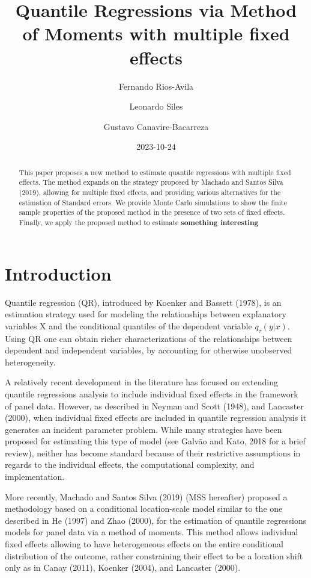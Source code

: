 \documentclass[
  letterpaper,
  DIV=11,
  numbers=noendperiod]{scrartcl}
\title{Quantile Regressions via Method of Moments with multiple fixed
effects}
\author{Fernando Rios-Avila \and Leonardo Siles \and Gustavo
Canavire-Bacarreza}
\date{2023-10-24}
\begin{document}
\maketitle
\begin{abstract}
This paper proposes a new method to estimate quantile regressions with
multiple fixed effects. The method expands on the strategy proposed by
Machado and Santos Silva (2019), allowing for multiple fixed effects,
and providing various alternatives for the estimation of Standard
errors. We provide Monte Carlo simulations to show the finite sample
properties of the proposed method in the presence of two sets of fixed
effects. Finally, we apply the proposed method to estimate
\textbf{something interesting}
\end{abstract}
\ifdefined\Shaded\renewenvironment{Shaded}{\begin{tcolorbox}[frame hidden, enhanced, borderline west={3pt}{0pt}{shadecolor}, interior hidden, breakable, boxrule=0pt, sharp corners]}{\end{tcolorbox}}\fi

\hypertarget{introduction}{%
\section{Introduction}\label{introduction}}

Quantile regression (QR), introduced by Koenker and Bassett (1978), is
an estimation strategy used for modeling the relationships between
explanatory variables X and the conditional quantiles of the dependent
variable \(q_\tau (y|x)\). Using QR one can obtain richer
characterizations of the relationships between dependent and independent
variables, by accounting for otherwise unobserved heterogeneity.

A relatively recent development in the literature has focused on
extending quantile regressions analysis to include individual fixed
effects in the framework of panel data. However, as described in Neyman
and Scott (1948), and Lancaster (2000), when individual fixed effects
are included in quantile regression analysis it generates an incident
parameter problem. While many strategies have been proposed for
estimating this type of model (see Galvão and Kato, 2018 for a brief
review), neither has become standard because of their restrictive
assumptions in regards to the individual effects, the computational
complexity, and implementation.

More recently, Machado and Santos Silva (2019) (MSS hereafter) proposed
a methodology based on a conditional location-scale model similar to the
one described in He (1997) and Zhao (2000), for the estimation of
quantile regressions models for panel data via a method of moments. This
method allows individual fixed effects allowing to have heterogeneous
effects on the entire conditional distribution of the outcome, rather
constraining their effect to be a location shift only as in Canay
(2011), Koenker (2004), and Lancaster (2000).
\end{document}
